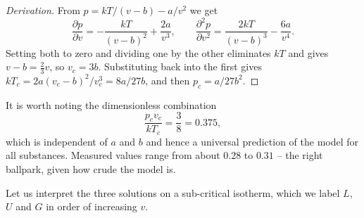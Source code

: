 \documentclass[a4paper]{scrartcl}
\begin{document}
\begin{proof}[Derivation]
	From $p = kT/(v-b) - a/v^2$ we get
	$$
	\frac{\partial p}{\partial v} = -\frac{kT}{(v-b)^2}+\frac{2a}{v^3}, \qquad \frac{\partial^2 p}{\partial v^2} = \frac{2kT}{(v-b)^3}-\frac{6a}{v^4}.
	$$
	Setting both to zero and dividing one by the other eliminates $kT$ and gives $v - b = \tfrac 23 v$, so $v_c = 3b$. Substituting back into the first gives $kT_c = 2a(v_c-b)^2/v_c^3 = 8a/27b$, and then $p_c = a/27b^2$.
\end{proof}

It is worth noting the dimensionless combination
$$
\frac{p_c v_c}{kT_c} = \frac{3}{8} = 0.375,
$$
which is independent of $a$ and $b$ and hence a universal prediction of the model for all substances. Measured values range from about $0.28$ to $0.31$ -- the right ballpark, given how crude the model is.

Let us interpret the three solutions on a sub-critical isotherm, which we label $L$, $U$ and $G$ in order of increasing $v$.
\end{document}
